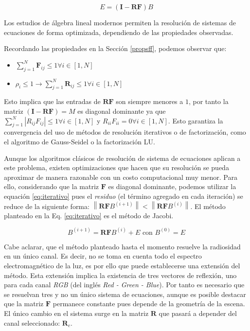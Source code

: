 \begin{equation}
	E = (\mathbf{I} - \mathbf{RF})B
\end{equation}

Los estudios de álgebra lineal modernos permiten la resolución de sistemas de ecuaciones de forma optimizada, dependiendo de las propiedades observadas.

Recordando las propiedades en la Sección \ref{propsff}, podemos observar que:

\begin{itemize}
	\item $\sum_{j=1}^{N} \mathbf{F}_{ij} \leq 1 \forall{i \in [1,N]}$
	\item $\rho_{i} \leq 1 \rightarrow \sum_{j=1}^{N} \mathbf{R}_{ij} \leq 1 \forall{i \in [1,N]}$
\end{itemize}

Esto implica que las entradas de $\mathbf{RF}$ s\texttt{}on siempre menores a $1$, por tanto la matriz $(\mathbf{I} - \mathbf{RF}) = M$ es diagonal dominante ya que $\sum_{j=1}^{N}|R_{ij}F_{ij}| \le 1 \forall i \in [1, N]$ y $R_{ii}F_{ii} = 0  \forall  i \in [1,N]$. Esto garantiza la convergencia del uso de métodos de resolución iterativos o de factorización, como el algoritmo de Gauss-Seidel o la factorización LU.

Aunque los algoritmos clásicos de resolución de sistema de ecuaciones aplican a este problema, existen optimizaciones que hacen que su resolución se pueda aproximar de manera razonable con un costo computacional muy menor. Para ello, considerando que la matriz $\mathbf{F}$ es diagonal dominante, podemos utilizar la equación \ref{eq:iterativo} pues el \textit{residuo} (el término agregado en cada iteración) se reduce de la siguiente forma: $\left\|\mathbf{RF}B^{(i+1)}\right\| < \left\|\mathbf{RF}B^{(i)}\right\|$. El método planteado en la Eq. \eqref{eq:iterativo} es el método de Jacobi.

\begin{equation}
	B^{(i+1)}  = \mathbf{RF}B^{(i)}  + E \text{ con }  B^{(0)} = E
	\label{eq:iterativo}
\end{equation}

Cabe aclarar, que el método planteado hasta el momento resuelve la radiosidad en un único canal. Es decir, no se toma en cuenta todo el espectro electromagnético de la luz, es por ello que puede establecerse una extensión del método. Esta extensión implica la existencia de tres vectores de reflexión, uno para cada canal \textit{RGB} (del inglés \textit{Red - Green - Blue}). Por tanto es necesario que se resuelvan tres y no un único sistema de ecuaciones, aunque es posible destacar que la matriz $\mathbf{F}$ permanece constante pues depende de la geometría de la escena. El único cambio en el sistema surge en la matriz $\mathbf{R}$ que pasará a depender del canal seleccionado: $\mathbf{R}_{c}$.

